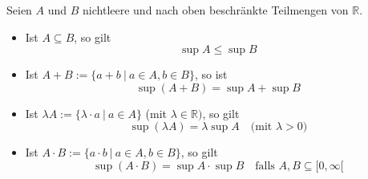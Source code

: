 Seien $A$ und $B$ nichtleere und nach oben beschränkte Teilmengen von $\mathbb{R}$.

\begin{itemize}

    \item Ist $A \subseteq B$, so gilt 
    $$\sup A \leq \sup B$$
    
    \item Ist $A+B := \{a + b \ | \ a \in A, b \in B\}$, so ist
    $$\sup(A+B) = \sup A + \sup B$$
    
    \item Ist $\lambda A := \{\lambda \cdot a \ | \ a \in A\}$ (mit $\lambda \in \mathbb{R})$, so gilt
    $$\sup(\lambda A) = \lambda \sup A \quad \text{(mit $\lambda > 0$)}$$
    
    \item Ist $A \cdot B := \{a \cdot b \ | \ a \in A, b \in B\}$, so gilt
    $$\sup(A \cdot B) = \sup A \cdot \sup B \quad \text{falls $A, B \subseteq [0, \infty[$}$$
    
\end{itemize}